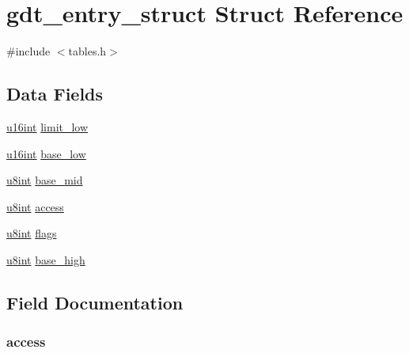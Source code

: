 \hypertarget{structgdt__entry__struct}{}\section{gdt\+\_\+entry\+\_\+struct Struct Reference}
\label{structgdt__entry__struct}


{\ttfamily \#include $<$tables.\+h$>$}

\subsection*{Data Fields}
\begin{DoxyCompactItemize}
\item 
\hyperlink{system_8h_a863d9497073aad2b991aeab2211d87af}{u16int} \hyperlink{structgdt__entry__struct_af9013229edfb91d4820f66b8df890ce3}{limit\+\_\+low}
\item 
\hyperlink{system_8h_a863d9497073aad2b991aeab2211d87af}{u16int} \hyperlink{structgdt__entry__struct_a0a776dced2c26f16298425cde39f8364}{base\+\_\+low}
\item 
\hyperlink{system_8h_a1026e682ffdadc1701c42cd44ce9efcf}{u8int} \hyperlink{structgdt__entry__struct_a35c709a004babd09046db9f667ba0646}{base\+\_\+mid}
\item 
\hyperlink{system_8h_a1026e682ffdadc1701c42cd44ce9efcf}{u8int} \hyperlink{structgdt__entry__struct_a360a726ac0b61d9e4e1be3ad34f80244}{access}
\item 
\hyperlink{system_8h_a1026e682ffdadc1701c42cd44ce9efcf}{u8int} \hyperlink{structgdt__entry__struct_a138dda98fcd4738346af61bcca8cf4b4}{flags}
\item 
\hyperlink{system_8h_a1026e682ffdadc1701c42cd44ce9efcf}{u8int} \hyperlink{structgdt__entry__struct_a706c81b840522a69ab6e6e941630d5e4}{base\+\_\+high}
\end{DoxyCompactItemize}


\subsection{Field Documentation}
\hypertarget{structgdt__entry__struct_a360a726ac0b61d9e4e1be3ad34f80244}{}
\subsubsection[{access}]{ access}\label{structgdt__entry__struct_a360a726ac0b61d9e4e1be3ad34f80244}
\hypertarget{structgdt__entry__struct_a706c81b840522a69ab6e6e941630d5e4}{}
